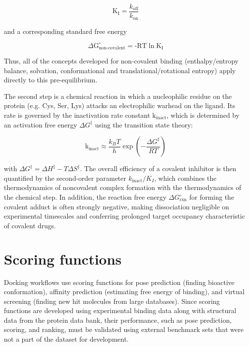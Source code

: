 \documentclass[12pt]{article}
\begin{document}
\begin{equation}
    \textrm{K}_\textrm{I} = \frac{k_{\textrm{off}}}{k_{\textrm{on}}} 
\label{covbind_eq2a}
\end{equation}

and a corresponding standard free energy

\begin{equation}
    \Delta \textrm{G}^\circ_{\textrm{non-covalent}} = \textrm{-RT} \ln \textrm{K}_\textrm{I}
\label{eq:covbind_eq2b}
\end{equation}

Thus, all of the concepts developed for non-covalent binding (enthalpy/entropy balance, solvation, conformational and translational/rotational entropy) apply directly to this pre-equilibrium\cite{CH3_Strelow2017}.

The second step is a chemical reaction in which a nucleophilic residue on the protein (e.g. Cys, Ser, Lys) attacks an electrophilic warhead on the ligand. Its rate is governed by the inactivation rate constant $\textrm{k}_{\textrm{inact}}$, which is determined by an activation free energy $\Delta G^\ddagger$ using the transition state theory:\cite{CH3_Schramm2011}

\begin{equation}
    \textrm{k}_{\textrm{inact}} \approx \frac{k_B T}{h} \exp\!\left(-\frac{\Delta G^\ddagger}{RT}\right)
\label{eq:covbind_eq3}
\end{equation}

with $\Delta G^\ddagger = \Delta H^\ddagger - T \Delta S^\ddagger$. The overall efficiency of a covalent inhibitor is then quantified by the second-order parameter $k_{\text{inact}}/K_I$, which combines the thermodynamics of noncovalent complex formation with the thermodynamics of the chemical step\cite{CH3_Strelow2017}. In addition, the reaction free energy $\Delta G^\circ_{\text{rxn}}$ for forming the covalent adduct is often strongly negative, making dissociation negligible on experimental timescales and conferring prolonged target occupancy characteristic of covalent drugs.

\section{Scoring functions}
Docking workflows use scoring functions for pose prediction (finding bioactive conformation), affinity prediction (estimating free energy of binding), and virtual screening (finding new hit molecules from large databases). Since scoring functions are developed using experimental binding data along with structural data from the protein data bank, their performance, such as pose prediction, scoring, and ranking, must be validated using external benchmark sets that were not a part of the dataset for development\cite{CH3_Su2019_CASF2016,CH3_Wang2014_CASF2013_Set,CH3_Wang2014_CASF2013_Results}.
\end{document}
